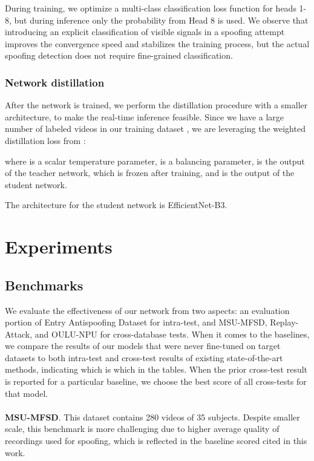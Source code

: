 \documentclass[10pt,twocolumn,letterpaper]{article}
\begin{document}
During training, we optimize a multi-class classification loss function for heads 1-8, but during inference only the probability from Head 8 is used. We observe that introducing an explicit classification of visible signals in a spoofing attempt improves the convergence speed and stabilizes the training process, but the actual spoofing detection does not require fine-grained classification. 

\subsubsection{Network distillation}

After the network is trained, we perform the distillation procedure with a smaller architecture, to make the real-time inference feasible. Since we have a large number of labeled videos in our training dataset , we are leveraging the weighted distillation loss from \cite{big-self-supervised}:


where  is a scalar temperature parameter,  is a balancing parameter,  is the output of the teacher network, which is frozen after training, and  is the output of the student network.

The architecture for the student network is EfficientNet-B3\cite{efficientnet}. 


\section{Experiments}

\subsection{Benchmarks}

We evaluate the effectiveness of our network from two aspects: an evaluation portion of Entry Antispoofing Dataset for intra-test, and MSU-MFSD, Replay-Attack, and OULU-NPU for cross-database tests. When it comes to the baselines, we compare the results of our models that were never fine-tuned on target datasets to both intra-test and cross-test results of existing state-of-the-art methods, indicating which is which in the tables. When the prior cross-test result is reported for a particular baseline, we choose the best score of all cross-tests for that model.

\paragraph{}\textbf{MSU-MFSD}. This dataset contains 280 videos of 35 subjects. Despite smaller scale, this benchmark is more challenging due to higher average quality of recordings used for spoofing, which is reflected in the baseline scored cited in this work.
\end{document}
